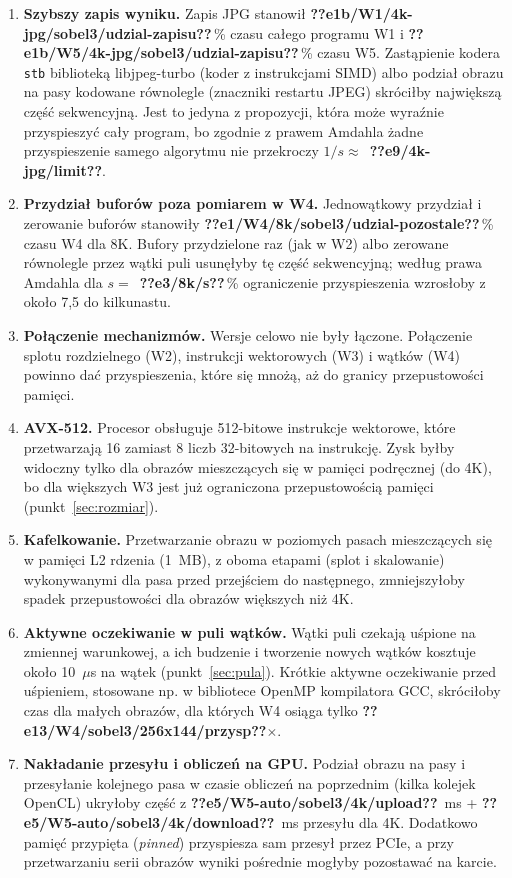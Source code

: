 \documentclass[12pt,a4paper]{article}
\providecommand{\wynik}[1]{\textbf{??#1??}}
\newcommand{\kod}[1]{\texttt{#1}}
\begin{document}
\begin{enumerate}
	\item \textbf{Szybszy zapis wyniku.} Zapis JPG stanowił \wynik{e1b/W1/4k-jpg/sobel3/udzial-zapisu}\,\% czasu całego programu W1 i \wynik{e1b/W5/4k-jpg/sobel3/udzial-zapisu}\,\% czasu W5. Zastąpienie kodera \kod{stb} biblioteką libjpeg-turbo (koder z instrukcjami SIMD) albo podział obrazu na pasy kodowane równolegle (znaczniki restartu JPEG) skróciłby największą część sekwencyjną. Jest to jedyna z propozycji, która może wyraźnie przyspieszyć cały program, bo zgodnie z prawem Amdahla żadne przyspieszenie samego algorytmu nie przekroczy $1/s \approx$~\wynik{e9/4k-jpg/limit}.
	\item \textbf{Przydział buforów poza pomiarem w W4.} Jednowątkowy przydział i zerowanie buforów stanowiły \wynik{e1/W4/8k/sobel3/udzial-pozostale}\,\% czasu W4 dla 8K. Bufory przydzielone raz (jak w W2) albo zerowane równolegle przez wątki puli usunęłyby tę część sekwencyjną; według prawa Amdahla dla $s =$~\wynik{e3/8k/s}\,\% ograniczenie przyspieszenia wzrosłoby z około 7,5 do kilkunastu.
	\item \textbf{Połączenie mechanizmów.} Wersje celowo nie były łączone. Połączenie splotu rozdzielnego (W2), instrukcji wektorowych (W3) i wątków (W4) powinno dać przyspieszenia, które się mnożą, aż do granicy przepustowości pamięci.
	\item \textbf{AVX-512.} Procesor obsługuje 512-bitowe instrukcje wektorowe, które przetwarzają 16 zamiast 8 liczb 32-bitowych na instrukcję. Zysk byłby widoczny tylko dla obrazów mieszczących się w pamięci podręcznej (do 4K), bo dla większych W3 jest już ograniczona przepustowością pamięci (punkt~\ref{sec:rozmiar}).
	\item \textbf{Kafelkowanie.} Przetwarzanie obrazu w poziomych pasach mieszczących się w pamięci L2 rdzenia (1~MB), z oboma etapami (splot i skalowanie) wykonywanymi dla pasa przed przejściem do następnego, zmniejszyłoby spadek przepustowości dla obrazów większych niż 4K.
	\item \textbf{Aktywne oczekiwanie w puli wątków.} Wątki puli czekają uśpione na zmiennej warunkowej, a ich budzenie i tworzenie nowych wątków kosztuje około 10~$\mu$s na wątek (punkt~\ref{sec:pula}). Krótkie aktywne oczekiwanie przed uśpieniem, stosowane np. w bibliotece OpenMP kompilatora GCC, skróciłoby czas dla małych obrazów, dla których W4 osiąga tylko \wynik{e13/W4/sobel3/256x144/przysp}$\times$.
	\item \textbf{Nakładanie przesyłu i obliczeń na GPU.} Podział obrazu na pasy i przesyłanie kolejnego pasa w czasie obliczeń na poprzednim (kilka kolejek OpenCL) ukryłoby część z \wynik{e5/W5-auto/sobel3/4k/upload}~ms + \wynik{e5/W5-auto/sobel3/4k/download}~ms przesyłu dla 4K. Dodatkowo pamięć przypięta (\emph{pinned}) przyspiesza sam przesył przez PCIe, a przy przetwarzaniu serii obrazów wyniki pośrednie mogłyby pozostawać na karcie.

\end{enumerate}
\end{document}
